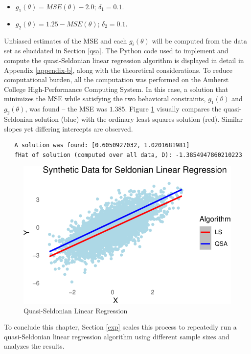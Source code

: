 \documentclass[12pt, twoside]{amherstthesis}
\begin{document}
\begin{itemize}
\item
  \(g_1(\theta) = MSE(\theta) - 2.0 \text{; } \delta_1 = 0.1\).
\item
  \(g_2(\theta) = 1.25 - MSE(\theta) \text{; } \delta_2 = 0.1\).
\end{itemize}
Unbiased estimates of the MSE and each \(g_i(\theta)\) will be computed from the data set as elucidated in Section \ref{qsa}. The Python code used to implement and compute the quasi-Seldonian linear regression algorithm is displayed in detail in Appendix \ref{appendix-b}, along with the theoretical considerations. To reduce computational burden, all the computation was performed on the Amherst College High-Performance Computing System. In this case, a solution that minimizes the MSE while satisfying the two behavioral constraints, \(g_1(\theta)\) and \(g_2(\theta)\), was found -- the MSE was \(1.385\). Figure \ref{fig:fig3} visually compares the quasi-Seldonian solution (blue) with the ordinary least squares solution (red). Similar slopes yet differing intercepts are observed.
\begin{verbatim}
   A solution was found: [0.6050927032, 1.0201681981]
   fHat of solution (computed over all data, D): -1.3854947860210223
\end{verbatim}
\begin{figure}

{\centering \includegraphics{Dasha-Asienga_StatThesis_files/figure-latex/fig3-1} 

}

\caption{Quasi-Seldonian Linear Regression}\label{fig:fig3}
\end{figure}
To conclude this chapter, Section \ref{exp} scales this process to repeatedly run a quasi-Seldonian linear regression algorithm using different sample sizes and analyzes the results.
\end{document}
